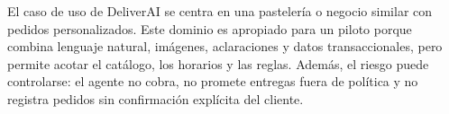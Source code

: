 El caso de uso de DeliverAI se centra en una pastelería o negocio similar con pedidos personalizados. Este dominio es apropiado para un piloto porque combina lenguaje natural, imágenes, aclaraciones y datos transaccionales, pero permite acotar el catálogo, los horarios y las reglas. Además, el riesgo puede controlarse: el agente no cobra, no promete entregas fuera de política y no registra pedidos sin confirmación explícita del cliente.
